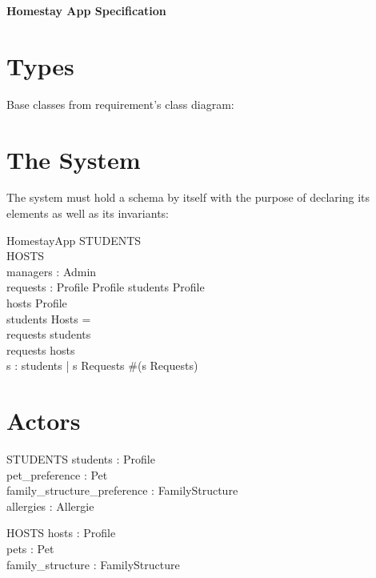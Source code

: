 \documentclass[11pt]{article}
\begin{document}
\begin{center}\LARGE
	\textbf{Homestay App Specification}
\end{center}

\section*{Types}
Base classes from requirement's class diagram:
\begin{zed}
\end{zed}

\section*{The System}
The system must hold a schema by itself with the purpose of declaring its elements as well as its invariants:
\begin{schema}{HomestayApp}
	\Xi STUDENTS\\
	\Xi HOSTS\\
	managers : \power Admin\\
	requests : Profile \rightarrow Profile
\where
	students \subseteq Profile\\
	hosts \subseteq Profile\\
	students \cap Hosts = \emptyset\\
	\dom requests \subset students\\
	\ran requests \subset hosts\\
	\forall s : students | s \in \dom Requests \bullet \#(s \dres Requests) 
\end{schema}

\section*{Actors}
\begin{schema}{STUDENTS}
	students : \power Profile\\
	pet_preference : Pet \rightarrow \nat\\
	family_structure_preference : \nat \rightarrow FamilyStructure\\
	allergies : \power Allergie\\
\where

\end{schema}

\begin{schema}{HOSTS}
	hosts : \power Profile\\
	pets : \power Pet\\
	family_structure : FamilyStructure\\
\where

\end{schema}
\end{document}

